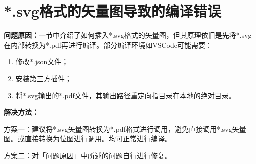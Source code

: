 \section{*.svg格式的矢量图导致的编译错误}

\textbf{问题原因：}一节中介绍了如何插入*.svg格式的矢量图，但其原理依旧是先将*.svg在内部转换为*.pdf再进行编译。部分编译环境如VSCode可能需要：

\begin{enumerate}[label=(\arabic*)]
    \item 修改*.json文件；
    \item 安装第三方插件；
    \item 将*.svg输出的*.pdf文件，其输出路径重定向指目录在本地的绝对目录。
\end{enumerate}

\textbf{解决方法：}

方案一：建议将*.svg矢量图转换为*.pdf格式进行调用，避免直接调用*.svg矢量图。或直接转换为位图进行调用。均可正常进行编译。

方案二：对「问题原因」中所述的问题自行进行修复。
